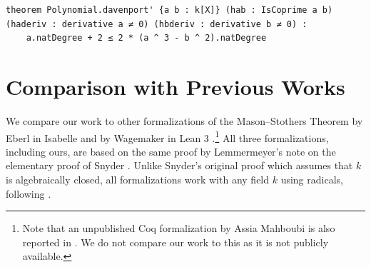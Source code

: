 \documentclass[runningheads]{llncs}
\begin{document}
\begin{verbatim}
theorem Polynomial.davenport' {a b : k[X]} (hab : IsCoprime a b) (haderiv : derivative a ≠ 0) (hbderiv : derivative b ≠ 0) :
    a.natDegree + 2 ≤ 2 * (a ^ 3 - b ^ 2).natDegree
\end{verbatim}

\section{Comparison with Previous Works}
\label{sec:comparison}

We compare our work to other formalizations of the Mason--Stothers Theorem by Eberl in Isabelle \cite{eberl17} and by Wagemaker in Lean 3 \cite{wagemaker-github,wagemaker18}.\footnote{Note that an unpublished Coq formalization by Assia Mahboubi is also reported in \cite[Chapter 5]{wagemaker18}. We do not compare our work to this as it is not publicly available.}
All three formalizations, including ours, are based on the same proof by Lemmermeyer's note \cite{franz} on the elementary proof of Snyder \cite{snyder00}.
Unlike Snyder's original proof \cite{snyder00} which assumes that $k$ is algebraically closed, all formalizations work
with any field $k$ using radicals, following \cite[Theorem 2.1.4, Corollary 2.1.5]{franz}.
\end{document}

